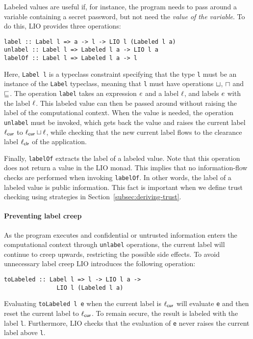 Labeled values are useful if, for instance, the program needs to pass around a variable containing a secret password, but not need the \emph{value of the variable}.
To do this, LIO provides three operations:
\begin{verbatim}
label :: Label l => a -> l -> LIO l (Labeled l a)
unlabel :: Label l => Labeled l a -> LIO l a
labelOf :: Label l => Labeled l a -> l
\end{verbatim}
Here, \texttt{Label l} is a typeclass constraint specifying that the type \texttt{l} must be an instance of the \texttt{Label} typeclass, meaning that \texttt{l} must have operations $\sqcup$, $\sqcap$ and $\sqsubseteq$. The operation \texttt{label} takes an expression $e$ and a label $\ell$, and labels $e$ with the label $\ell$. This labeled value can then be passed around without raising the label of the computational context. When the value is needed, the operation \texttt{unlabel} must be invoked, which gets back the value and raises the current label $\ell_{\mathsf{cur}}$ to $\ell_{\mathsf{cur}} \sqcup \ell$, while checking that the new current label flows to the clearance label $\ell_{\mathsf{clr}}$ of the application.

Finally, \texttt{labelOf} extracts the label of a labeled value. Note that this operation does not return a value in the LIO monad. This implies that no information-flow checks are performed when invoking \texttt{labelOf}. In other words, the label of a labeled value is public information. This fact is important when we define trust checking using strategies in Section~\ref{subsec:deriving-trust}.

\paragraph{Preventing label creep}
As the program executes and confidential or untrusted information enters the computational context through \texttt{unlabel} operations, the current label will continue to creep upwards, restricting the possible side effects. To avoid unnecessary label creep LIO introduces the following operation:
\begin{verbatim}
toLabeled :: Label l => l -> LIO l a ->
               LIO l (Labeled l a)
\end{verbatim}
Evaluating \texttt{toLabeled l e} when the current label is $\ell_{\mathsf{cur}}$ will evaluate \texttt{e} and then reset the current label to $\ell_{\mathsf{cur}}$. To remain secure, the result is labeled with the label \texttt{l}. Furthermore, LIO checks that the evaluation of \texttt{e} never raises the current label above \texttt{l}.